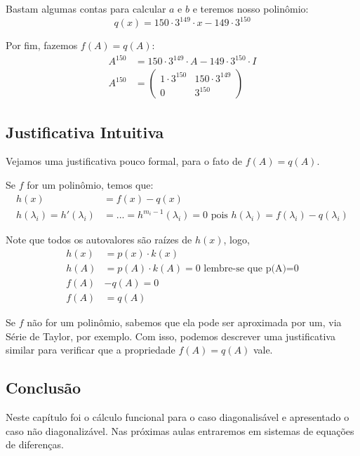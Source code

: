 \documentclass[12pt]{article}
\begin{document}
Bastam algumas contas para calcular $a$ e $b$ e teremos nosso polinômio:
\begin{equation*}
	q(x)=150\cdot 3^{149}\cdot x-149\cdot 3^{150}
\end{equation*}

Por fim, fazemos $f(A)=q(A)$:
\begin{align*}
	A^{150}&=150\cdot 3^{149}\cdot A-149\cdot 3^{150}\cdot I\\
	A^{150}&=\begin{pmatrix}
		1\cdot 3^{150}&150\cdot 3^{149}  \\
		0& 3^{150}
	\end{pmatrix}	
\end{align*}

\subsection{Justificativa Intuitiva}

Vejamos uma justificativa pouco formal, para o fato de $f(A)=q(A)$.

Se $f$ for um polinômio, temos que:
\begin{align*}
	h(x)&=f(x)-q(x)\\
	h(\lambda_i)=h'(\lambda_i)&=...=h^{m_i-1}(\lambda_i)=0 \mbox{ pois } h(\lambda_i)=f(\lambda_i)-q(\lambda_i)
\end{align*}

Note que todos os autovalores são raízes de $h(x)$, logo,
\begin{align*}
	h(x)&=p(x)\cdot k(x)\\
	h(A)&=p(A)\cdot k(A)=0 \mbox{ lembre-se que p(A)=0}\\
	f(A)&-q(A)=0\\
	f(A)&=q(A)
\end{align*}

Se $f$ não for um polinômio, sabemos que ela pode ser aproximada por um, via Série de Taylor, por exemplo. Com isso, podemos descrever uma justificativa similar para verificar que a propriedade $f(A)=q(A)$ vale.

\subsection{Conclusão}
Neste capítulo foi o cálculo funcional para o caso diagonalisável e apresentado o caso não diagonalizável. Nas próximas aulas entraremos em sistemas de equações de diferenças.
\end{document}
